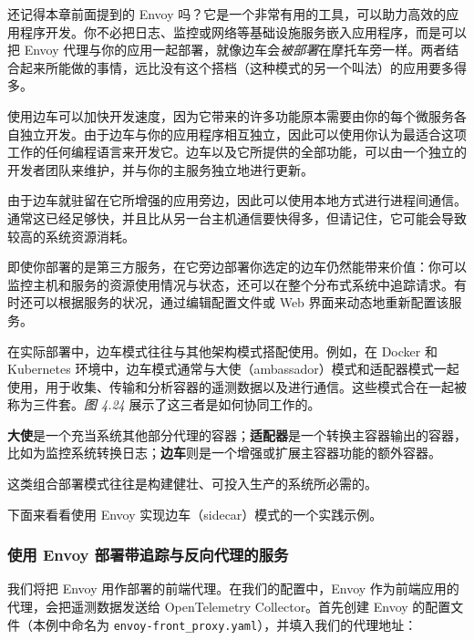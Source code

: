 \label{idx:402}
\label{idx:403}
还记得本章前面提到的 Envoy 吗？它是一个非常有用的工具，可以助力高效的应用程序开发。你不必把日志、监控或网络等基础设施服务嵌入应用程序，而是可以把 Envoy 代理与你的应用一起部署，就像边车会\emph{被部署}在摩托车旁一样。两者结合起来所能做的事情，远比没有这个搭档（这种模式的另一个叫法）的应用要多得多。

使用边车可以加快开发速度，因为它带来的许多功能原本需要由你的每个微服务各自独立开发。由于边车与你的应用程序相互独立，因此可以使用你认为最适合这项工作的任何编程语言来开发它。边车以及它所提供的全部功能，可以由一个独立的开发者团队来维护，并与你的主服务独立地进行更新。

由于边车就驻留在它所增强的应用旁边，因此可以使用本地方式进行进程间通信。通常这已经足够快，并且比从另一台主机通信要快得多，但请记住，它可能会导致较高的系统资源消耗。

即使你部署的是第三方服务，在它旁边部署你选定的边车仍然能带来价值：你可以监控主机和服务的资源使用情况与状态，还可以在整个分布式系统中追踪请求。有时还可以根据服务的状况，通过编辑配置文件或 Web 界面来动态地重新配置该服务。

\label{idx:404}
在实际部署中，边车模式往往与其他架构模式搭配使用。例如，在 Docker 和 Kubernetes 环境中，边车模式通常与大使（ambassador）模式和适配器模式一起使用，用于收集、传输和分析容器的遥测数据以及进行通信。这些模式合在一起被称为三件套。\emph{图 4.24} 展示了这三者是如何协同工作的。


\label{idx:405}
\label{idx:406}
\label{idx:407}
\textbf{大使}是一个充当系统其他部分代理的容器；\textbf{适配器}是一个转换主容器输出的容器，比如为监控系统转换日志；\textbf{边车}则是一个增强或扩展主容器功能的额外容器。

这类组合部署模式往往是构建健壮、可投入生产的系统所必需的。

下面来看看使用 Envoy 实现边车（sidecar）模式的一个实践示例。

\subsubsection{使用 Envoy 部署带追踪与反向代理的服务}

\label{idx:408}
\label{idx:409}
我们将把 Envoy 用作部署的前端代理。在我们的配置中，Envoy 作为前端应用的代理，会把遥测数据发送给 OpenTelemetry Collector。首先创建 Envoy 的配置文件（本例中命名为 \texttt{envoy-front\_\allowbreak{}proxy.\allowbreak{}yaml}），并填入我们的代理地址：

